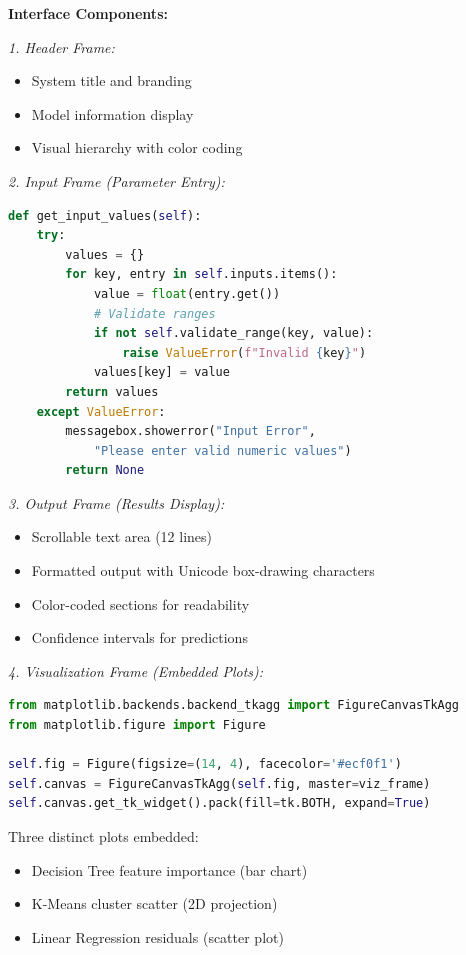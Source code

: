 \documentclass[conference]{IEEEtran}
\begin{document}
\textbf{Interface Components:}

\textit{1. Header Frame:}
\begin{itemize}
    \item System title and branding
    \item Model information display
    \item Visual hierarchy with color coding
\end{itemize}

\textit{2. Input Frame (Parameter Entry):}
\begin{lstlisting}[language=Python, caption=Input Validation]
def get_input_values(self):
    try:
        values = {}
        for key, entry in self.inputs.items():
            value = float(entry.get())
            # Validate ranges
            if not self.validate_range(key, value):
                raise ValueError(f"Invalid {key}")
            values[key] = value
        return values
    except ValueError:
        messagebox.showerror("Input Error", 
            "Please enter valid numeric values")
        return None
\end{lstlisting}

\textit{3. Output Frame (Results Display):}
\begin{itemize}
    \item Scrollable text area (12 lines)
    \item Formatted output with Unicode box-drawing characters
    \item Color-coded sections for readability
    \item Confidence intervals for predictions
\end{itemize}

\textit{4. Visualization Frame (Embedded Plots):}
\begin{lstlisting}[language=Python, caption=Matplotlib Integration]
from matplotlib.backends.backend_tkagg import FigureCanvasTkAgg
from matplotlib.figure import Figure

self.fig = Figure(figsize=(14, 4), facecolor='#ecf0f1')
self.canvas = FigureCanvasTkAgg(self.fig, master=viz_frame)
self.canvas.get_tk_widget().pack(fill=tk.BOTH, expand=True)
\end{lstlisting}

Three distinct plots embedded:
\begin{itemize}
    \item Decision Tree feature importance (bar chart)
    \item K-Means cluster scatter (2D projection)
    \item Linear Regression residuals (scatter plot)
\end{itemize}
\end{document}
